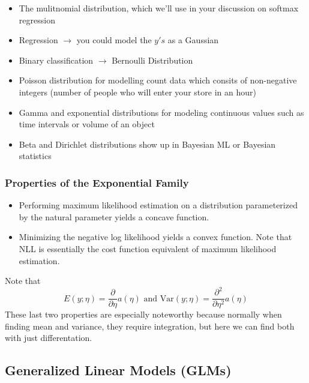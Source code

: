 \documentclass[12pt]{scrartcl}
\begin{document}
\begin{itemize}
    \item The mulitnomial distribution, which we'll use in your discussion on softmax
          regression
    \item Regression $\to$ you could model the $y's$ as a Gaussian
    \item Binary classification $\to$ Bernoulli Distribution
    \item Poisson distribution for modelling count data which consits of non-negative
          integers (number of people who will enter your store in an hour)
    \item Gamma and exponential distributions for modeling continuous values such as time
          intervals or volume of an object
    \item Beta and Dirichlet distributions show up in Bayesian ML or Bayesian statistics
\end{itemize}

\subsubsection{Properties of the Exponential Family}
\begin{itemize}
    \item Performing maximum likelihood estimation on a distribution parameterized by the
          natural parameter yields a concave function.
    \item Minimizing the negative log likelihood yields a convex function. Note that NLL
          is essentially the cost function equivalent of maximum likelihood estimation.
\end{itemize}
\begin{note}
    Note that
    \[E(y; \eta) = \frac{\partial}{\partial \eta}a(\eta) \text{ and Var}(y; \eta) = \frac{\partial^2}{\partial\eta^2}a(\eta)\]
    These last two properties are especially noteworthy because normally when
    finding mean and variance, they require integration, but here we can find both
    with just differentation.
\end{note}

\subsection{Generalized Linear Models (GLMs)}
\end{document}
